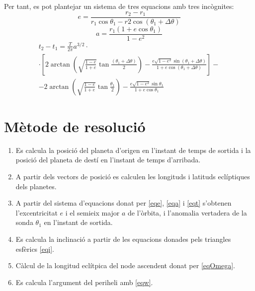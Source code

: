 Per tant, es pot plantejar un sistema de tres equacions amb tres incògnites:
\begin{equation}
e=\frac{r_{2}-r_{1}}{r_{1}\cos\theta_{1}-r{2}\cos\left(\theta_{1}+\Delta\theta\right)}
\label{eqe}
\end{equation}
\begin{equation}
a=\frac{r_{1}\left(1+e\cos\theta_{1}\right)}{1-e^{2}}
\label{eqa}
\end{equation}
\begin{multline}
	t_{2}-t_{1}=\frac{T}{2\pi}a^{3/2}\cdot \\
	\cdot\left[2\arctan\left(\sqrt{\frac{1-e}{1+e}}\tan\frac{\left(\theta_{1}+\Delta\theta\right)}{2}\right)-\frac{e\sqrt{1-e^{2}}\sin\left(\theta_{1}+\Delta\theta\right)}{1+e\cos\left(\theta_{1}+\Delta\theta\right)}\right]- \\
	-2\arctan\left(\sqrt{\frac{1-e}{1+e}}\tan\frac{\theta_{1}}{2}\right)-\frac{e\sqrt{1-e^{2}}\sin\theta_{1}}{1+e\cos\theta_{1}}
	\label{eqt}
\end{multline}

\section{Mètode de resolució}
\begin{enumerate}
	\item Es calcula la posició del planeta d'origen en l'instant de temps de sortida i la posició del planeta de destí en l'instant de temps d'arribada.
	\item A partir dels vectors de posició es calculen les longituds i latituds eclíptiques dels planetes.
	\item A partir del sistema d'equacions donat per \ref{eqe}, \ref{eqa} i \ref{eqt} s'obtenen l'excentricitat $e$ i el semieix major $a$ de l'òrbita, i l'anomalia vertadera de la sonda $\theta_{1}$ en l'instant de sortida.
	\item Es calcula la inclinació a partir de les equacions donades pels triangles esfèrics \ref{eqi}.
	\item Càlcul de la longitud eclítpica del node ascendent donat per \ref{eqOmega}.
	\item Es calcula l'argument del periheli amb \ref{eqw}.
\end{enumerate}